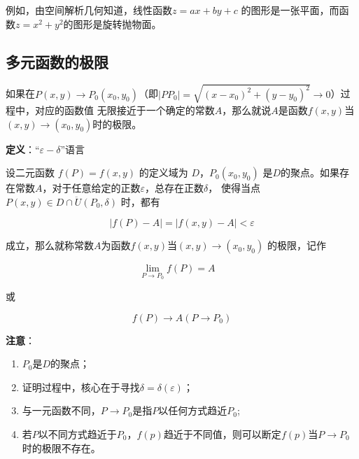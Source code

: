 \documentclass[12pt, a4paper]{article}
\numberwithin{equation}{section}
\begin{document}
    例如，由空间解析几何知道，线性函数$z=ax+by+c$
    的图形是一张平面，而函数$z=x^2+y^2$的图形是旋转抛物面。

\subsection{多元函数的极限}

    如果在\(P\left(x,y\right) \rightarrow P_0\left(x_0,y_0\right)\)（即\(\left|PP_0\right| =
    \sqrt{\left(x-x_0\right)^2 + \left(y-y_0\right)^2} \rightarrow 0\)）过程中，对应的函数值
    无限接近于一个确定的常数\(A\)，那么就说\(A\)是函数\(f\left(x,y\right)\)当
    \(\left(x,y\right) \rightarrow \left(x_0,y_0\right)\)时的极限。

    \textbf{定义}：“\(\varepsilon - \delta\)”语言

    设二元函数 $f(P)=f(x, y)$ 的定义域为 $D$，$P_0\left(x_0, y_0\right)$
    是$D$的聚点。如果存在常数$A$，对于任意给定的正数$\varepsilon$，总存在正数$\delta$，
    使得当点$P(x, y) \in D \cap \ddot{U}\left(P_0, \delta\right)$ 时，都有

    \begin{equation}
        \left|f(P)-A\right|=\left|f(x, y)-A\right|<\varepsilon
    \end{equation}

    成立，那么就称常数\(A\)为函数\(f\left(x,y\right)\)当\(\left(x,y\right) \rightarrow \left(x_0,y_0\right)\)
    的极限，记作

    \begin{equation}
        \lim _{P \rightarrow P_0} f(P)=A \quad
    \end{equation}

    或

    \begin{equation}
        f(P) \rightarrow A\left(P \rightarrow P_0\right)
    \end{equation}

    \textbf{注意}：

    \begin{enumerate}
        \item \(P_0\)是\(D\)的聚点；
        \item 证明过程中，核心在于寻找\(\delta = \delta\left(\varepsilon\right)\)；
        \item 与一元函数不同，\(P \rightarrow P_0\)是指\(P\)以任何方式趋近\(P_0\);
        \item 若\(P\)以不同方式趋近于\(P_0\)，\(f\left(p\right)\)趋近于不同值，则可以断定\(f\left(p\right)\)当\(P \rightarrow P_0\)时的极限不存在。
    \end{enumerate}
\end{document}
